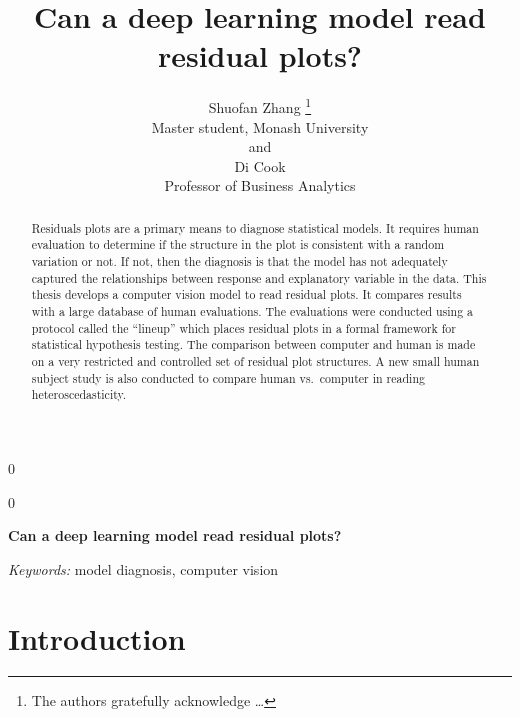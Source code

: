 \documentclass[12pt]{article}
\newcommand{\blind}{0}
\begin{document}
\def\spacingset#1{\renewcommand{\baselinestretch}%
{#1}\small\normalsize} \spacingset{1}



\blind
{
  \title{\bf Can a deep learning model read residual plots?}

  \author{
        Shuofan Zhang \thanks{The authors gratefully acknowledge \ldots{}} \\
    Master student, Monash University\\
     and \\     Di Cook \\
    Professor of Business Analytics\\
      }
  \maketitle
} \fi

\blind
{
  \bigskip
  \bigskip
  \bigskip
  \begin{center}
    {\LARGE\bf Can a deep learning model read residual plots?}
  \end{center}
  \medskip
} \fi

\bigskip
\begin{abstract}
Residuals plots are a primary means to diagnose statistical models. It
requires human evaluation to determine if the structure in the plot is
consistent with a random variation or not. If not, then the diagnosis is
that the model has not adequately captured the relationships between
response and explanatory variable in the data. This thesis develops a
computer vision model to read residual plots. It compares results with a
large database of human evaluations. The evaluations were conducted
using a protocol called the ``lineup'' which places residual plots in a
formal framework for statistical hypothesis testing. The comparison
between computer and human is made on a very restricted and controlled
set of residual plot structures. A new small human subject study is also
conducted to compare human vs.~computer in reading heteroscedasticity.
\end{abstract}

\noindent%
{\it Keywords:} model diagnosis, computer vision
\vfill

\newpage
\spacingset{1.45} %

\section{Introduction}
\label{sec:intro}
\end{document}
